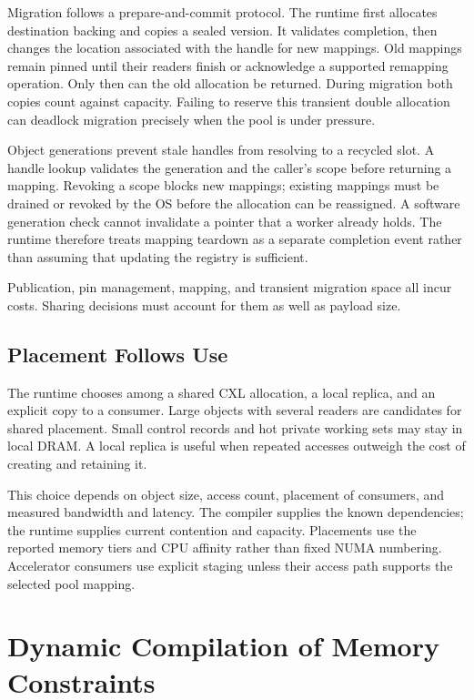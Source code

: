 \documentclass[letterpaper,twocolumn,10pt]{article}
\begin{document}
Migration follows a prepare-and-commit protocol. The runtime first allocates
destination backing and copies a sealed version. It validates completion,
then changes the location associated with the handle for new mappings. Old
mappings remain pinned until their readers finish or acknowledge a supported
remapping operation. Only then can the old allocation be returned. During
migration both copies count against capacity. Failing to reserve this
transient double allocation can deadlock migration precisely when the pool is
under pressure.

Object generations prevent stale handles from resolving to a recycled slot.
A handle lookup validates the generation and the caller's scope before
returning a mapping. Revoking a scope blocks new mappings; existing mappings
must be drained or revoked by the OS before the allocation can be reassigned.
A software generation check cannot invalidate a pointer that a worker already
holds. The runtime therefore treats mapping teardown as a separate completion
event rather than assuming that updating the registry is sufficient.

Publication, pin management, mapping, and transient migration space all incur
costs. Sharing decisions must account for them as well as payload size.

\subsection{Placement Follows Use}

The runtime chooses among a shared CXL allocation, a local replica, and an
explicit copy to a consumer. Large objects with several readers are candidates
for shared placement. Small control records and hot private working sets may
stay in local DRAM. A local replica is useful when repeated accesses outweigh
the cost of creating and retaining it.

This choice depends on object size, access count, placement of consumers, and
measured bandwidth and latency. The compiler supplies the known dependencies;
the runtime supplies current contention and capacity. Placements use the
reported memory tiers and CPU affinity rather than fixed NUMA numbering.
Accelerator consumers use explicit staging unless their access path supports
the selected pool mapping.

\section{Dynamic Compilation of Memory Constraints}
\end{document}

